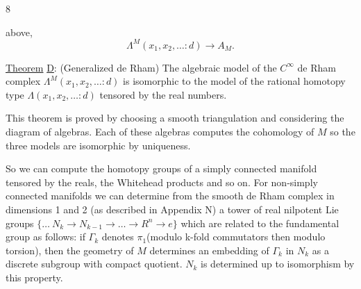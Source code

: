 \hfill 8

above,
\[
\Lambda^M(x_1,x_2,\ldots:d)\to A_M.
\]

\uline{Theorem} \uline{D}: (Generalized de Rham) The algebraic model
of the $C^\infty$ de Rham complex $\Lambda^M(x_1,x_2,\ldots:d)$ is isomorphic
to the model of the rational homotopy type
$\Lambda(x_1,x_2,\ldots:d)$ tensored by the real numbers.

This theorem is proved by choosing a smooth triangulation and considering the diagram of algebras.
Each of these algebras computes the cohomology of
$M$ so the three models are isomorphic by uniqueness.

So we can compute the homotopy groups of a simply connected manifold tensored by the reals, the Whitehead products and so on.
For non-simply connected manifolds we can determine from the smooth de Rham complex in
dimensions 1 and 2 (as described in Appendix N) a tower
of real nilpotent Lie groups $\{\ldots\ N_k\to N_{k-1}\to\ldots\to R^n\to e\}$
which are related to the fundamental group as follows:
if $\Gamma_k$ denotes $\pi_1$(modulo k-fold commutators then modulo
torsion), then the geometry of $M$ determines an embedding
of $\Gamma_k$ in $N_k$ as a discrete subgroup with compact quotient.
$N_k$ is determined up to isomorphism by this property.

